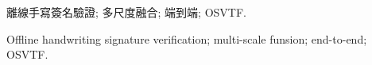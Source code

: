 \documentclass{format/MUSTThesisC}
\begin{document}

\AddToShipoutPicture{\BackgroundPic}


\def\Ctitle 		{基於Transformer的離線手寫簽名驗證模型結構研究}
\def\Etitle 		{Research on the Structure of Offline Handwritten Signature Verification Models Based on Transformer}
\def\Sname 			{王茗琛}
\def\Sno 			{2230025907}
\def\Sfaculty 		{創新工程學院}
\def\Sprogram 		{智能技術碩士}
\def\Smajor 		{智能技術碩士}
\def\Ssupervisor	{劉新}
\def\Sdate			{YYYY/MM/DD}

\mustTitle



\mustCabstract
{
	
}
{離線手寫簽名驗證; 多尺度融合; 端到端; OSVTF.}



\mustEabstract
{
	
}
{Offline handwriting signature verification; multi-scale funsion; end-to-end; OSVTF.}








\mustcontents





\listfigures
{
	
}
{}

\listtables
{
	
}
{}




\listsymbols
{
	
}
{}




\listabbreviations
{
	
}
{}





\end{document}
